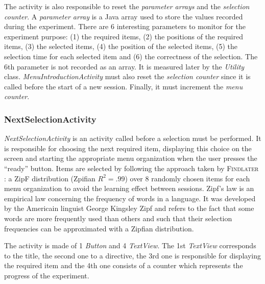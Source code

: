 The activity is also responsible to reset the \textit{parameter arrays} and 
the \textit{selection counter}. A \textit{parameter array} is a Java array used 
to store the values recorded during the experiment. There are 6 interesting 
parameters to monitor for the experiment purpose: (1) the required items, (2) 
the positions of the required items, (3) the selected items, (4) the position 
of the selected items, (5) the selection time for each selected item and (6) 
the correctness of the selection. The 6th parameter is not recorded as an 
array. It is measured later by the \textit{Utility} class. 
\textit{MenuIntroductionActivity} must also reset the \textit{selection counter} 
since it is called before the start of a new session. Finally, it must 
increment the \textit{menu counter}.

\subsubsection{NextSelectionActivity}
\textit{NextSelectionActivity} is an activity called before a selection must 
be performed. It is responsible for choosing the next required item, 
displaying this choice on the screen and starting the appropriate menu 
organization when the user presses the \enquote{ready} button. Items are 
selected by following the approach taken by \textsc{Findlater} \cite{findlater} 
: a ZipF 
distribution (Zpifian $R^2=.99$) over 8 randomly chosen items for each menu 
organization to avoid the learning effect between sessions. Zipf's law is an 
empirical law concerning the frequency of words in a language. It was developed 
by the Americain linguist George Kingsley Zipf and refers to the fact that some 
words are more frequently used than others and such that their selection 
frequencies can be approximated with a Zipfian distribution.\newline

The activity is made of 1 \textit{Button} and 4 \textit{TextView}. The 1st 
\textit{TextView} corresponds to the title, the second one to a directive, the 
3rd one is responsible for displaying the required item and the 4th one
consists of a counter which represents the progress of the experiment.

